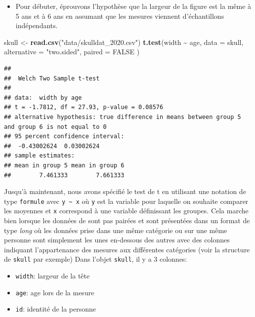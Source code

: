\documentclass[
  12pt,
]{book}
\newenvironment{Shaded}{\begin{snugshade}}{\end{snugshade}}
\newcommand{\DataTypeTok}[1]{\textcolor[rgb]{0.13,0.29,0.53}{#1}}
\newcommand{\KeywordTok}[1]{\textcolor[rgb]{0.13,0.29,0.53}{\textbf{#1}}}
\newcommand{\NormalTok}[1]{#1}
\newcommand{\OperatorTok}[1]{\textcolor[rgb]{0.81,0.36,0.00}{\textbf{#1}}}
\newcommand{\OtherTok}[1]{\textcolor[rgb]{0.56,0.35,0.01}{#1}}
\newcommand{\StringTok}[1]{\textcolor[rgb]{0.31,0.60,0.02}{#1}}
\providecommand{\tightlist}{%
  \setlength{\itemsep}{0pt}\setlength{\parskip}{0pt}}
\begin{document}
\begin{itemize}
\tightlist
\item
  Pour débuter, éprouvons l'hypothèse que la largeur de la figure est la même à 5 ans et à 6 ans en assumant que les mesures viennent d'échantillons indépendants.
\end{itemize}

\begin{Shaded}
\begin{Highlighting}[]
\NormalTok{skull \textless{}{-}}\StringTok{ }\KeywordTok{read.csv}\NormalTok{(}\StringTok{"data/skulldat\_2020.csv"}\NormalTok{)}
\KeywordTok{t.test}\NormalTok{(width }\OperatorTok{\textasciitilde{}}\StringTok{ }\NormalTok{age,}
  \DataTypeTok{data =}\NormalTok{ skull,}
  \DataTypeTok{alternative =} \StringTok{"two.sided"}\NormalTok{,}
  \DataTypeTok{paired =} \OtherTok{FALSE}
\NormalTok{)}
\end{Highlighting}
\end{Shaded}

\begin{verbatim}
## 
##  Welch Two Sample t-test
## 
## data:  width by age
## t = -1.7812, df = 27.93, p-value = 0.08576
## alternative hypothesis: true difference in means between group 5 and group 6 is not equal to 0
## 95 percent confidence interval:
##  -0.43002624  0.03002624
## sample estimates:
## mean in group 5 mean in group 6 
##        7.461333        7.661333
\end{verbatim}

Jusqu'à maintenant, nous avons spécifié le test de t en utilisant une notation de type \texttt{formule} avec \texttt{y\ \textasciitilde{}\ x} où \texttt{y} est la variable pour laquelle on souhaite comparer les moyennes et \texttt{x} correspond à une variable définissant les groupes.
Cela marche bien lorsque les données de sont pas pairées et sont présentées dans un format de type \emph{long} où les données prise dans une même catégorie ou sur une même personne sont simplement les unes en-dessous des autres avec des colonnes indiquant l'appartenance des mesures aux différentes catégories (voir la structure de \texttt{skull} par exemple)
Dans l'objet \texttt{skull}, il y a 3 colonnes:

\begin{itemize}
\tightlist
\item
  \texttt{width}: largeur de la tête
\item
  \texttt{age}: age lors de la mesure
\item
  \texttt{id}: identité de la personne
\end{itemize}
\end{document}
